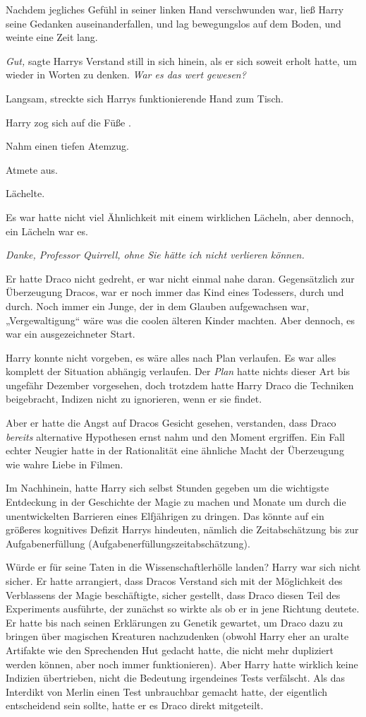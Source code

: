 {Nachdem jegliches Gefühl in seiner linken Hand verschwunden war, ließ Harry seine Gedanken auseinanderfallen, und lag bewegungslos auf dem Boden, und weinte eine Zeit lang.

\emph{Gut,} sagte Harrys Verstand still in sich hinein, als er sich soweit erholt hatte, um wieder in Worten zu denken. \emph{War es das wert gewesen?}

Langsam, streckte sich Harrys funktionierende Hand zum Tisch.

Harry zog sich auf die Füße .

Nahm einen tiefen Atemzug.

Atmete aus.

Lächelte.

Es war hatte nicht viel Ähnlichkeit mit einem wirklichen Lächeln, aber dennoch, ein Lächeln war es.

\emph{Danke, Professor Quirrell, ohne Sie hätte ich nicht verlieren können.}

Er hatte Draco nicht gedreht, er war nicht einmal nahe daran. Gegensätzlich zur Überzeugung Dracos, war er noch immer das Kind eines Todessers, durch und durch. Noch immer ein Junge, der in dem Glauben aufgewachsen war, „Vergewaltigung“ wäre was die coolen älteren Kinder machten. Aber dennoch, es war ein ausgezeichneter Start.

Harry konnte nicht vorgeben, es wäre alles nach Plan verlaufen. Es war alles komplett der Situation abhängig verlaufen. Der \emph{Plan} hatte nichts dieser Art bis ungefähr Dezember vorgesehen, doch trotzdem hatte Harry Draco die Techniken beigebracht, Indizen nicht zu ignorieren, wenn er sie findet.

Aber er hatte die Angst auf Dracos Gesicht gesehen, verstanden, dass Draco \emph{bereits} alternative Hypothesen ernst nahm und den Moment ergriffen. Ein Fall echter Neugier hatte in der Rationalität eine ähnliche Macht der Überzeugung wie wahre Liebe in Filmen.

Im Nachhinein, hatte Harry sich selbst Stunden gegeben um die wichtigste Entdeckung in der Geschichte der Magie zu machen und Monate um durch die unentwickelten Barrieren eines Elfjährigen zu dringen. Das könnte auf ein größeres kognitives Defizit Harrys hindeuten, nämlich die Zeitabschätzung bis zur Aufgabenerfüllung (Aufgabenerfüllungszeitabschätzung).

Würde er für seine Taten in die Wissenschaftlerhölle landen? Harry war sich nicht sicher. Er hatte arrangiert, dass Dracos Verstand sich mit der Möglichkeit des Verblassens der Magie beschäftigte, sicher gestellt, dass Draco diesen Teil des Experiments ausführte, der zunächst so wirkte als ob er in jene Richtung deutete. Er hatte bis nach seinen Erklärungen zu Genetik gewartet, um Draco dazu zu bringen über magischen Kreaturen nachzudenken (obwohl Harry eher an uralte Artifakte wie den Sprechenden Hut gedacht hatte, die nicht mehr dupliziert werden können, aber noch immer funktionieren). Aber Harry hatte wirklich keine Indizien übertrieben, nicht die Bedeutung irgendeines Tests verfälscht. Als das Interdikt von Merlin einen Test unbrauchbar gemacht hatte, der eigentlich entscheidend sein sollte, hatte er es Draco direkt mitgeteilt.

}
